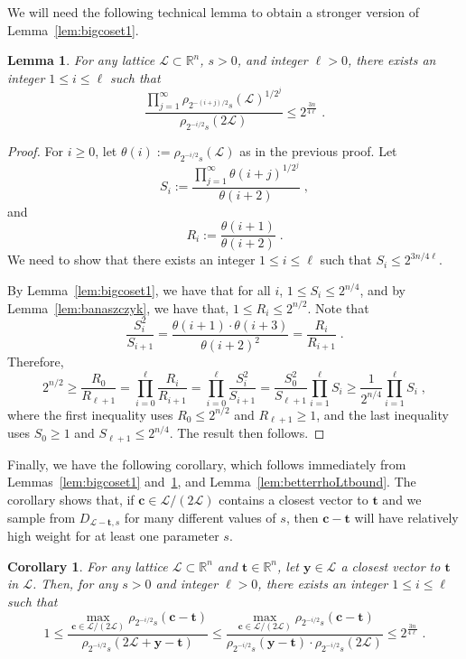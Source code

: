\documentclass[11pt]{article}
\newtheorem{lemma}[theorem]{Lemma}
\newtheorem{corollary}[theorem]{Corollary}
\newcommand{\R}{\ensuremath{\mathbb{R}}}
\renewcommand{\vec}[1]{\ensuremath{\mathbf{#1}}}
\newcommand{\lat}{\mathcal{L}}
\begin{document}
We will need the following technical lemma to obtain a stronger version of Lemma~\ref{lem:bigcoset1}.

\begin{lemma}
\label{lem:bigcoset2}
For any lattice $\lat \subset \R^n$, $s > 0$, and integer $\ell >0$, there exists an integer $1 \le i \le \ell$ such that 
\[
\frac{\prod_{j=1}^{\infty} \rho_{2^{-(i+j)/2}s}(\lat)^{1/2^j}}{\rho_{2^{-i/2}s}(2\lat)}  \le 2^{\frac{3n}{4\ell}}
\; .
\]
\end{lemma}
\begin{proof}
For $i \ge 0$, let $\theta(i) := \rho_{2^{-i/2}s}(\lat)$ as in the previous proof.
Let
\[
S_i := \frac{\prod_{j=1}^{\infty} \theta(i+j)^{1/2^j}}{\theta(i+2)} 
\; ,
\]
and 
\[
R_i := \frac{\theta(i+1)}{\theta(i+2)} \;.
\]
We need to show that there exists an integer $1 \le i \le \ell $ such that $S_i \le 2^{3n/4\ell}$.

By Lemma~\ref{lem:bigcoset1}, we have that for all $i$, $1 \le S_i \le 2^{n/4}$, and by Lemma~\ref{lem:banaszczyk}, we have that, $1 \le R_i \le 2^{n/2}$. 
Note that
\[
\frac{S_i^2}{S_{i+1}} = \frac{\theta(i+1) \cdot \theta(i+3)}{\theta(i+2)^2} = \frac{R_i}{R_{i+1}} \;.
\]
Therefore,
\begin{equation*}
	2^{n/2}										\ge \frac{R_0}{R_{\ell+1}} 
											= \prod_{i = 0}^{\ell} \frac{R_i}{R_{i+1}} 
                       = \prod_{i = 0}^\ell \frac{S_i^2}{S_{i+1}} 
                       = \frac{S_0^2}{S_{\ell+1}} \prod_{i=1}^\ell S_i 
											 \ge \frac{1}{2^{n/4}} \prod_{i=1}^\ell S_i \;,
\end{equation*}
where the first inequality uses $R_0 \le 2^{n/2}$ and $R_{\ell + 1} \ge 1$, and the last inequality uses $S_0 \ge 1$ and $S_{\ell + 1} \le 2^{n/4}$. The result then follows.
\end{proof}

Finally, we have the following corollary, which follows immediately from Lemmas~\ref{lem:bigcoset1} and~\ref{lem:bigcoset2}, and Lemma~\ref{lem:betterrhoLtbound}. The corollary shows that, if $\vec{c} \in \lat/(2\lat)$ contains a closest vector to $\vec{t}$ and we sample from $D_{\lat - \vec{t}, s}$ for many different values of $s$, then $\vec{c} - \vec{t}$ will have relatively high weight for at least one parameter $s$.

\begin{corollary}
\label{cor:bigcoset}
For any lattice $\lat \subset \R^n$ and $\vec{t} \in \R^n$, let $\vec{y} \in \lat$ a closest vector to $\vec{t}$ in $\lat$. Then, for any $s > 0$ and integer $\ell > 0$, there exists an integer $1 \le i \le \ell$ such that 
\[
1 
\leq \frac{ \max_{\vec{c} \in \lat/(2\lat)}\rho_{2^{-i/2}s}(\vec{c} - \vec{t})}{\rho_{2^{-i/2}s}(2\lat + \vec{y} - \vec{t})} 
\le \frac{ \max_{\vec{c} \in \lat/(2\lat)}\rho_{2^{-i/2}s}(\vec{c} - \vec{t})}{\rho_{2^{-i/2}s}(\vec{y} - \vec{t}) \cdot \rho_{2^{-i/2}s}(2\lat)} 
\le 2^{\frac{3n}{4\ell}} 
\; .
\]
\end{corollary}
\end{document}
